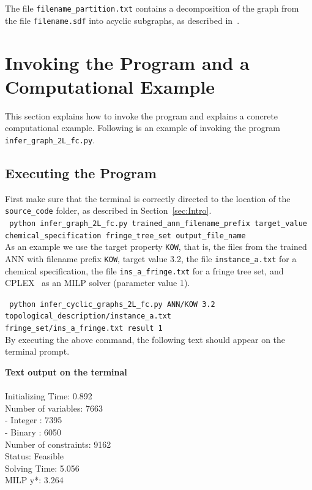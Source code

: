 \documentclass[11pt, titlepage, dvipdfmx, twoside]{article}
\begin{document}
\noindent
The file {\tt filename\_partition.txt} contains a 
decomposition of the graph from the 
file {\tt filename.sdf} into acyclic subgraphs,
as described in~\cite{cyclic_BH_arxiv}.



\section{Invoking the Program and a Computational Example}
\label{sec:Exp}

This section explains how to invoke the program
and explains a concrete computational example.
Following is an example of invoking the
program {\tt infer\_graph\_2L\_fc.py}.


\subsection{Executing the Program}
\label{sec:Exp_1}

First make sure that the terminal is 
correctly directed to the location
of the {\tt source\_code} folder, as described in Section~\ref{sec:Intro}. \\

\noindent
{\tt 
 python  infer\_graph\_2L\_fc.py 
trained\_ann\_filename\_prefix
target\_value \\
 \phantom{python } 
 chemical\_specification
 fringe\_tree\_set
output\_file\_name
 }\\


As an example we use the target property {\tt KOW}, 
that is, the files from the trained ANN with filename prefix {\tt KOW},
target value 3.2,
the file {\tt instance\_a.txt} for a chemical specification,
the file {\tt ins\_a\_fringe.txt} for a fringe tree set,
and CPLEX~\cite{cplex} as an MILP solver (parameter value 1).

{\tt 
 python infer\_cyclic\_graphs\_2L\_fc.py 
ANN/KOW
3.2 \\
 \phantom{python } 
topological\_description/instance\_a.txt \\
 \phantom{python } 
fringe\_set/ins\_a\_fringe.txt
result
1
 }\\


By executing the above command, the following text should appear on the terminal prompt.

\bigskip

\begin{oframed}
{\bf Text output on the terminal}\\\\
 Initializing Time: 0.892        \\       
Number of variables: 7663        \\ 
 - Integer : 7395                \\ 
 - Binary  : 6050                \\ 
 Number of constraints: 9162     \\ 
Status: Feasible                 \\ 
Solving Time: 5.056              \\ 
MILP y*: 3.264                   
\end{oframed}
\end{document}
